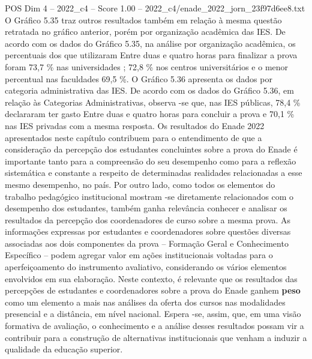 \begin{textsample}{POS Dim 4 – 2022\_c4 – Score 1.00 – 2022\_c4/enade\_2022\_jorn\_23f97d6ee8.txt}
O Gráfico 5.35 traz outros resultados também em relação à mesma questão retratada no gráfico anterior, porém por organização acadêmica das IES.
De acordo com os dados do Gráfico 5.35, na análise por organização acadêmica, os percentuais dos que utilizaram Entre duas e quatro horas para finalizar a prova foram 73,7 \% nas universidades ; 72,8 \% nos centros universitários e o menor percentual nas faculdades 69,5 \%.
O Gráfico 5.36 apresenta os dados por categoria administrativa das IES.
De acordo com os dados do Gráfico 5.36, em relação às Categorias Administrativas, observa -se que, nas IES públicas, 78,4 \% declararam ter gasto Entre duas e quatro horas para concluir a prova e 70,1 \% nas IES privadas com a mesma resposta.
Os resultados do Enade 2022 apresentados neste capítulo contribuem para o entendimento de que a consideração da percepção dos estudantes concluintes sobre a prova do Enade é importante tanto para a compreensão do seu desempenho como para a reflexão sistemática e constante a respeito de determinadas realidades relacionadas a esse mesmo desempenho, no país.
Por outro lado, como todos os elementos do trabalho pedagógico institucional mostram -se diretamente relacionados com o desempenho dos estudantes, também ganha relevância conhecer e analisar os resultados da percepção dos coordenadores de curso sobre a mesma prova.
As informações expressas por estudantes e coordenadores sobre questões diversas associadas aos dois componentes da prova – Formação Geral e Conhecimento Específico – podem agregar valor em ações institucionais voltadas para o aperfeiçoamento do instrumento avaliativo, considerando os vários elementos envolvidos em sua elaboração.
Neste contexto, é relevante que os resultados das percepções de estudantes e coordenadores sobre a prova do Enade ganhem \textbf{peso} como um elemento a mais nas análises da oferta dos cursos nas modalidades presencial e a distância, em nível nacional.
Espera -se, assim, que, em uma visão formativa de avaliação, o conhecimento e a análise desses resultados possam vir a contribuir para a construção de alternativas institucionais que venham a induzir a qualidade da educação superior.

\end{textsample}
